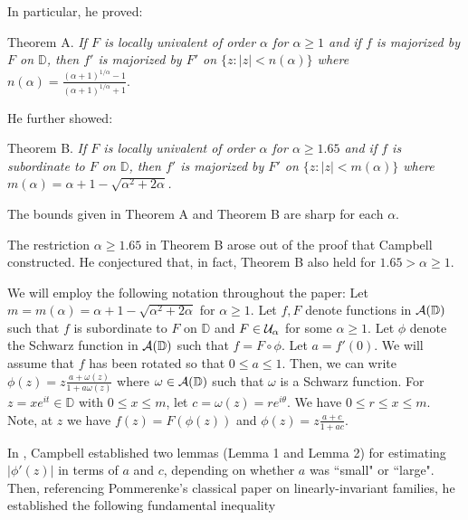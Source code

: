 \documentclass[12pt]{article}
\newcommand{\cA}{{\cal{A}}}
\newcommand{\cU}{{\cal{U}}}
\newcommand{\D}{{\mathbb D}}
\newcommand{\ds}{\displaystyle}
\begin{document}
In particular, he proved: 

\vspace{0.05in}

Theorem A. \emph{ If $F$ is locally univalent of order $\alpha$ for $\alpha \ge 1$ and if $f$ is majorized by $F$ on 
$\D$, then $f'$ is majorized by $F'$ on $\{ z : |z| < n(\alpha) \}$ where 
${\ds n(\alpha) = \frac{(\alpha+1)^{1/\alpha}-1}{(\alpha+1)^{1/\alpha}+1}}$}.  

\noindent He further showed:  

Theorem B. \emph{ If $F$ is locally univalent of order $\alpha$ for $\alpha \ge 1.65$ and if $f$ is subordinate to $F$ on 
$\D$, then $f'$ is majorized by $F'$ on $\{ z : |z| < m(\alpha) \}$ where 
$m(\alpha) = \alpha +1 - \sqrt{\alpha^2+2\alpha}$.}  

\vspace{0.05in}

\noindent The bounds given in Theorem A and Theorem B are sharp for each $\alpha$.  

\vspace{0.05in}

The restriction $\alpha \ge 1.65$ in Theorem B arose out of the proof that Campbell constructed.  He conjectured that, 
in fact, Theorem B also held for $1.65 > \alpha \ge 1$.  

\vspace{0.05in}

We will employ the following notation throughout the paper: 
Let $m = m(\alpha) = \alpha+1 - \sqrt{\alpha^2 + 2\alpha}$ for $\alpha \ge 1$.
Let $f,F$ denote functions in $\cA(\D)$ such that $f$ is subordinate to $F$ on $\D$ and 
$F \in \cU_\alpha$ for some $\alpha \ge 1$.
Let $\phi$ denote the Schwarz function in $\cA(\D)$ such that 
$f=F\circ\phi$. Let $a = f'(0)$.  We will 
assume that $f$ has been rotated so that $0 \le a \le 1$.  Then, we can write
${\ds \phi(z)=z\frac{a+\omega(z)}{1+a\omega(z)}}$ where $\omega \in \cA(\D)$ such that 
$\omega$ is a Schwarz function. For $z = xe^{it} \in \D$ 
with $0 \le x \le m$, let $c= \omega(z) = re^{i\theta}$.  We have 
$0 \le r \le x \le m$.  Note, at $z$ we have $f(z)=F(\phi(z))$ and 
${\ds \phi(z)= z\frac{a+c}{1+ac}}$.  


In \cite{DMC03}, Campbell established two lemmas (Lemma 1 and Lemma 2) for estimating $|\phi'(z)|$ in terms of $a$ and $c$, 
depending on whether $a$ was ``small" or ``large".  Then, referencing Pommerenke's classical paper \cite{Pom01}
on linearly-invariant families, he established the following fundamental inequality
\end{document}
